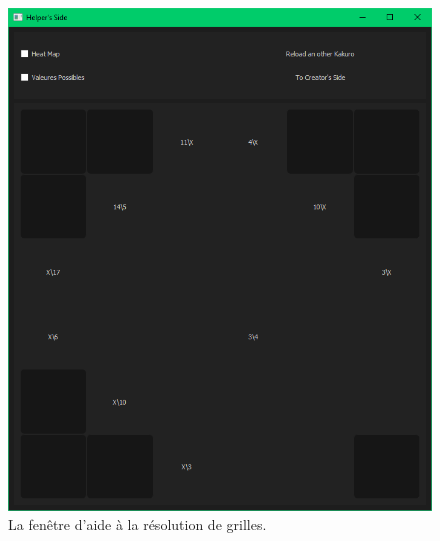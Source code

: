 \documentclass[french,12pt]{article}
\begin{document}
\begin{figure}[ht]
  \begin{center}
    \includegraphics[width=\textwidth]{./ressources/helperSide.png} 
  \end{center}
  \caption{La fenêtre d'aide à la résolution de grilles.}
\end{figure}
\end{document}
